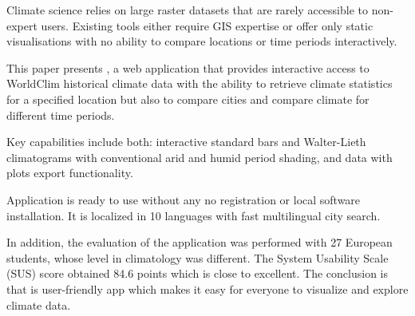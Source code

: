 





Climate science relies on large raster datasets that are rarely accessible to
non-expert users. Existing tools either require GIS expertise or offer only
static visualisations with no ability to compare locations or time periods
interactively.

This paper presents \webappname{}, a web application that provides
interactive access to  WorldClim historical climate data with the ability to 
retrieve climate statistics for a specified location but also to compare cities 
and compare climate for different time periods.

Key capabilities include both: interactive standard bars and  Walter-Lieth climatograms
with conventional arid and humid period shading, and data with plots export functionality.

Application is ready to use without any no registration 
or local software installation. It is localized in 10 languages with fast
multilingual city search.

In addition, the evaluation of the application was performed with 27 European students, whose level in
climatology was different. The System Usability Scale (SUS) score obtained 84.6 points which 
is close to excellent. The conclusion is that
\webappname{} is user-friendly app which makes it easy for everyone to visualize and explore climate data.